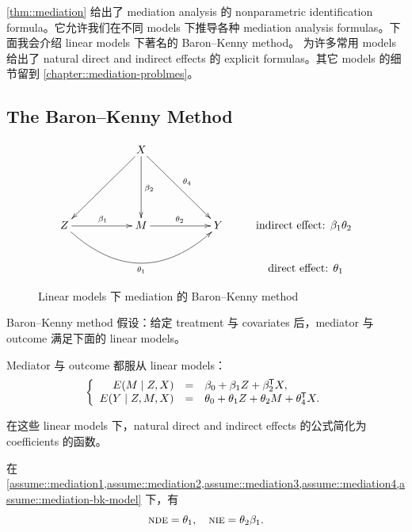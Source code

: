\cref{thm::mediation} 给出了 mediation analysis 的 nonparametric identification formula。它允许我们在不同 models 下推导各种 mediation analysis formulas。下面我会介绍 linear models 下著名的 Baron--Kenny method。
\citet{vanderweele2015explanation} 为许多常用 models 给出了 natural direct and indirect effects 的 explicit formulas。其它 models 的细节留到 \cref{chapter::mediation-problmes}。

\subsection{The Baron--Kenny Method}


\begin{figure}[ht]
\centering
$$
\begin{xy}
\xymatrix{
&  & X \ar[ddll] \ar[dd]^{\beta_2} \ar[ddrr]^{\theta_4} \\
&&\\
Z \ar[rr]^{\beta_1} \ar@/_2.8pc/[rrrr]_{\theta_1} & & M\ar[rr]^{\theta_2} & & Y & \text{indirect effect: } \beta_1\theta_2 \\
&&&&& \text{  direct effect: } \theta_1 }
\end{xy}
$$
\caption{Linear models 下 mediation 的 Baron--Kenny method}\label{fg::mediationDAG-BK}
\end{figure}

Baron--Kenny method 假设：给定 treatment 与 covariates 后，mediator 与 outcome 满足下面的 linear models。

\begin{assumption}
\label{assume::mediation-bk-model}
Mediator 与 outcome 都服从 linear models：
$$
\left\{\begin{array}{rcl}
E(M \mid Z, X) &=&  \beta_0 + \beta_1 Z + \beta_2^{\mkern-1.5mu\mathsf{T}} X, \\
E(Y\mid Z,M,X) &=& \theta_0 + \theta_1 Z + \theta_2 M + \theta_4^{\mkern-1.5mu\mathsf{T}} X.
\end{array}\right.
$$
\end{assumption}


 
在这些 linear models 下，natural direct and indirect effects 的公式简化为 coefficients 的函数。

\begin{corollary}
\label{corollary::bk-formulas}
在 \cref{assume::mediation1,assume::mediation2,assume::mediation3,assume::mediation4,assume::mediation-bk-model} 下，有
$$
\textsc{nde} = \theta_1
,\quad 
\textsc{nie} = \theta_2 \beta_1 .
$$
\end{corollary}



